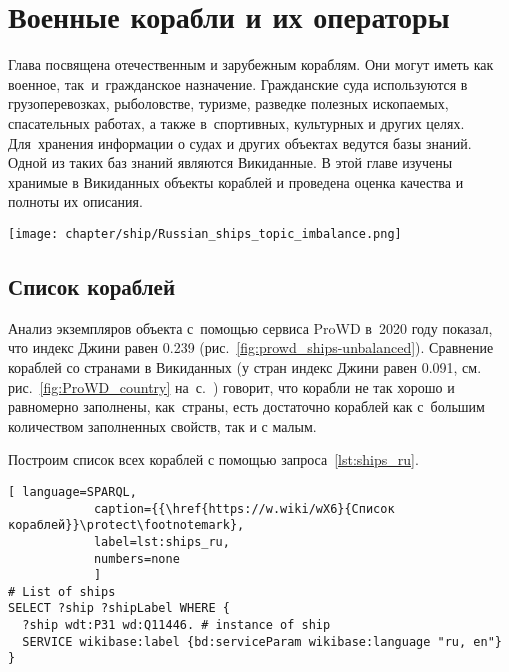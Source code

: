 \chapter{Военные корабли и их операторы}
\label{ch:ships-chapter}

Глава посвящена отечественным и зарубежным кораблям. 
Они могут иметь как военное, так~и~гражданское назначение. 
Гражданские суда используются в грузоперевозках, рыболовстве, туризме, 
разведке полезных ископаемых, спасательных работах, 
а также в~спортивных, культурных и других целях. 
Для~хранения информации о судах и других объектах ведутся базы знаний. 
Одной из таких баз знаний являются Викиданные. 
В этой главе изучены хранимые в Викиданных объекты кораблей и проведена оценка качества и полноты их описания.


\begin{marginfigure}[0.0cm]
  \texttt{[image: chapter/ship/Russian\_ships\_topic\_imbalance.png]}
  \caption{Индекс Джини~--- равномерность заполнения свойств <<кораблей>>,\\
           2020 год}
  \label{fig:prowd_ships-unbalanced}%
\end{marginfigure}


\section{Список кораблей}

Анализ экземпляров объекта  
с~помощью сервиса ProWD в~2020 году показал, 
что индекс Джини равен 0.239 (рис.~\ref{fig:prowd_ships-unbalanced}). 
%
Сравнение кораблей со странами в Викиданных 
(у стран индекс Джини равен 0.091, см. рис.~\ref{fig:ProWD_country} 
                                  на~с.~\pageref{fig:ProWD_country}) 
говорит, что корабли не так хорошо и равномерно заполнены, как~страны, 
есть достаточно кораблей как с~большим количеством заполненных свойств, 
так и с малым.

Построим список всех кораблей с помощью запроса~\ref{lst:ships_ru}.


\begin{lstlisting}[ language=SPARQL, 
            caption={{\href{https://w.wiki/wX6}{Список кораблей}}\protect\footnotemark}, 
            label=lst:ships_ru, 
            numbers=none
            ]
# List of ships
SELECT ?ship ?shipLabel WHERE {
  ?ship wdt:P31 wd:Q11446. # instance of ship
  SERVICE wikibase:label {bd:serviceParam wikibase:language "ru, en"}
}
\end{lstlisting}


